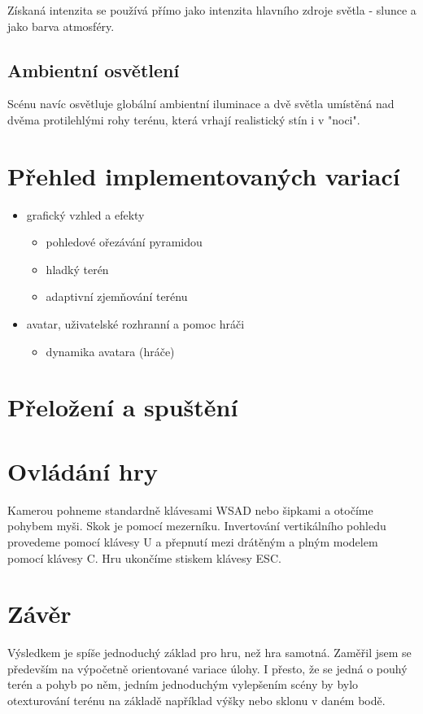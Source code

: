 \documentclass{zcu_sp}
\begin{document}
Získaná intenzita se používá přímo jako intenzita hlavního zdroje světla - slunce a jako barva atmosféry.
\subsection{Ambientní osvětlení}
Scénu navíc osvětluje globální ambientní iluminace a dvě světla umístěná nad
dvěma protilehlými rohy terénu, která vrhají realistický stín i v "noci".

\section{Přehled implementovaných variací}
\begin{itemize}
	\item grafický vzhled a efekty
	\begin{itemize}
		\item pohledové ořezávání pyramidou
		\item hladký terén
		\item adaptivní zjemňování terénu
	\end{itemize}

	\item avatar, uživatelské rozhranní a pomoc hráči
	\begin{itemize}
		\item dynamika avatara (hráče)
	\end{itemize}
\end{itemize}

\section{Přeložení a spuštění}
\section{Ovládání hry}
Kamerou pohneme standardně klávesami WSAD nebo šipkami a otočíme pohybem myši.
Skok je pomocí mezerníku. Invertování vertikálního pohledu provedeme pomocí
klávesy U a přepnutí mezi drátěným a plným modelem pomocí klávesy C. Hru
ukončíme stiskem klávesy ESC.

\section{Závěr}
Výsledkem je spíše jednoduchý základ pro hru, než hra samotná. Zaměřil jsem se
především na výpočetně orientované variace úlohy. I přesto, že se jedná o pouhý
terén a pohyb po něm, jedním jednoduchým vylepšením scény by bylo otexturování
terénu na základě například výšky nebo sklonu v daném bodě.
\end{document}
